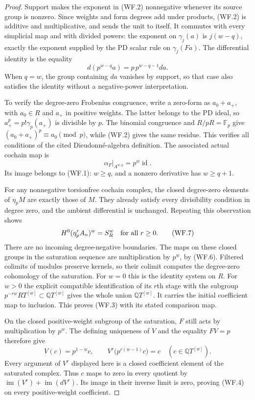\begin{proof}
Support makes the exponent in (WF.2) nonnegative whenever
its source group is nonzero. Since weights and form degrees
add under products, (WF.2) is additive and multiplicative,
and sends the unit to itself. It commutes with every
simplicial map and with divided powers: the exponent on
$\gamma_j(a)$ is $j(w-q)$, exactly the exponent supplied
by the PD scalar rule on $\gamma_j(Fa)$.
The differential identity is the equality
\[
                 d(p^{w-q}a)
                   =p\,p^{w-q-1}da.                \tag{WF.5}
\]
When $q=w$, the group containing $da$ vanishes by support,
so that case also satisfies the identity without a
negative-power interpretation.

To verify the degree-zero Frobenius congruence, write a
zero-form as $a_0+a_+$, with $a_0\in R$ and $a_+$ in
positive weights. The latter belongs to the PD ideal, so
$a_+^p=p!\gamma_p(a_+)$ is divisible by $p$.
The binomial congruence and $R/pR=\mathbb F_p$ give
$(a_0+a_+)^p\equiv a_0\pmod p$, while (WF.2) gives the
same residue. This verifies all conditions of the cited
Dieudonn\'e-algebra definition. The associated actual
cochain map is
\[
                  \alpha_F|_{A^{w,q}}=p^w\operatorname{id}.
 \tag{WF.6}
\]
Its image belongs to (WF.1): $w\geq q$, and a nonzero
derivative has $w\geq q+1$.

For any nonnegative torsionfree cochain complex, the
closed degree-zero elements of $\eta_pM$ are exactly
those of $M$. They already satisfy every divisibility
condition in degree zero, and the ambient differential
is unchanged. Repeating this observation shows
\[
              H^0(\eta_p^rA_n)^w=S_R^w
                       \quad\hbox{for all }r\geq0. \tag{WF.7}
\]
There are no incoming degree-negative boundaries.
The maps on these closed groups in the saturation
sequence are multiplication by $p^w$, by (WF.6).
Filtered colimits of modules preserve kernels, so their
colimit computes the degree-zero cohomology of the
saturation. For $w=0$ this is the identity system on $R$.
For $w>0$ the explicit compatible identification of its
$r$th stage with the subgroup
$p^{-rw}R T^{[w]}\subset\mathbb Q T^{[w]}$ gives the
whole union $\mathbb Q T^{[w]}$.
It carries the initial coefficient map to inclusion.
This proves (WF.3) with its stated comparison map.

On the closed positive-weight subgroup of the saturation,
$F$ still acts by multiplication by $p^w$.
The defining uniqueness of $V$ and the equality $FV=p$
therefore give
\[
       V(c)=p^{1-w}c,
       \qquad
       V^r\bigl(p^{r(w-1)}c\bigr)=c
              \quad(c\in\mathbb Q T^{[w]}).         \tag{WF.8}
\]
Every argument of $V^r$ displayed here is a closed
coefficient element of the saturated complex.
Thus $c$ maps to zero in every quotient by
$\operatorname{im}(V^r)+\operatorname{im}(dV^r)$.
Its image in their inverse limit is zero, proving (WF.4)
on every positive-weight coefficient.


\end{proof}
